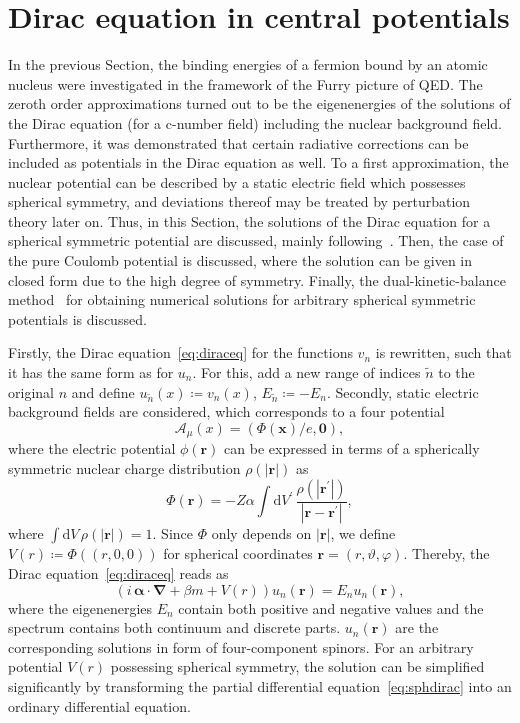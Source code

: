 \section{Dirac equation in central potentials}
\label{sec:sph_dirac}
In the previous Section, the binding energies of a fermion bound by an atomic nucleus were investigated in the framework of the Furry picture of QED. The zeroth order approximations turned out to be the eigenenergies of the solutions of the Dirac equation (for a c-number field) including the nuclear background field. Furthermore, it was demonstrated that certain radiative corrections can be included as potentials in the Dirac equation as well. To a first approximation, the nuclear potential can be described by a static electric field which possesses spherical symmetry, and deviations thereof may be treated by perturbation theory later on. Thus, in this Section, the solutions of the Dirac equation for a spherical symmetric potential are discussed, mainly following~\cite{greiner2000, weinberg2005}. Then, the case of the pure Coulomb potential is discussed, where the solution can be given in closed form due to the high degree of symmetry. Finally, the dual-kinetic-balance method~\cite{Shabaev2004} for obtaining numerical solutions for arbitrary spherical symmetric potentials is discussed.

Firstly, the Dirac equation~\eqref{eq:diraceq} for the functions $v_n$ is rewritten, such that it has the same form as for $u_n$. For this, add a new range of indices $\tilde{n}$ to the original $n$ and define $u_{\tilde{n}}(x)\coloneqq v_n(x)$, $E_{\tilde{n}}\coloneqq -E_n$. Secondly, static electric background fields are considered, which corresponds to a four potential
\begin{equation}
\mathcal{A}_\mu(x)=(\Phi(\mathbf{x})/e,\mathbf{0}),
\end{equation}
where the electric potential $\phi(\mathbf{r})$ can be expressed in terms of a spherically symmetric nuclear charge distribution $\rho(\mathbf{|r|})$ as
\begin{equation}
\Phi(\mathbf{r})=-Z\alpha\int\mathrm{d}V^{\prime}\,\frac{\rho(|\mathbf{r^{\prime}}|)}{|\mathbf{r}-\mathbf{r^{\prime}}|},
\end{equation}
where $\int \mathrm{d}V\,\rho(|\mathbf{r}|)=1$. Since $\Phi$ only depends on $|\mathbf{r}|$, we define $V(r)\coloneqq \Phi((r,0,0))$ for spherical coordinates $\mathbf{r}=(r,\vartheta,\varphi)$. Thereby, the Dirac equation~\eqref{eq:diraceq} reads as
\begin{equation}
\left( i\,\pmb{\alpha} \cdot \mathbf{\nabla} + \beta m + V(r) \right) u_n(\mathbf{r}) =  E_n u_n(\mathbf{r}),
\label{eq:sphdirac}
\end{equation}
where the eigenenergies $E_n$ contain both positive and negative values and the spectrum contains both continuum and discrete parts. $u_n(\mathbf{r})$ are the corresponding solutions in form of four-component spinors. For an arbitrary potential $V(r)$ possessing spherical symmetry, the solution can be simplified significantly by transforming the partial differential equation~\eqref{eq:sphdirac} into an ordinary differential equation.

